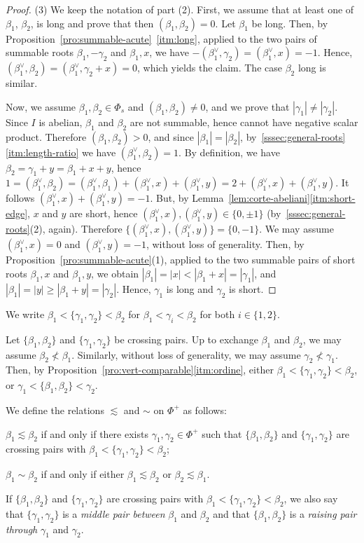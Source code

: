 \documentclass[ALCO,published]{cedram}
\theoremstyle{plain}
\newcommand\be{\beta}
\newcommand\ga{\gamma}
\begin{document}
\begin{proof}
(3)
We keep the notation of  part (2).
First, we assume that at least one of $\be_1$, $\be_2$, is long and prove that then $(\be_1, \be_2)=0$.
Let  $\be_1$ be long. 
Then, by Proposition~\ref{pro:summable-acute}~\ref{itm:long}, applied to the two pairs of summable roots $\be_1, -\ga_2$ and $\be_1, x$, we have $-(\be_1^\vee, \ga_2)=(\be_1^\vee, x)=-1$. 
Hence, $(\be_1^\vee, \be_2)=(\be_1^\vee, \ga_2+ x)=0$, which yields the claim.
The case $\be_2$ long is similar.
\par
Now, we assume $\be_1,\be_2\in \Phi_s$ and $(\be_1, \be_2)\neq 0$, and we prove that $|\ga_1|\neq |\ga_2|$.
Since $I$ is abelian, $\be_1$ and $\be_2$ are not summable, hence cannot have negative scalar product. 
Therefore $(\be_1, \be_2)> 0$, and since $|\be_1|=|\be_2|$,  by~\ref{sssec:general-roots}\ref{itm:length-ratio} we have $(\be_1^\vee, \be_2)=1$.  
By definition, we have $\be_2=\ga_1+y=\be_1+x+y$, hence 
$1=(\be_1^\vee, \be_2)=(\be_1^\vee, \be_1)+(\be_1^\vee, x)+(\be_1^\vee, y)=2+(\be_1^\vee, x)+(\be_1^\vee, y)$. 
It follows $(\be_1^\vee, x)+(\be_1^\vee, y)=-1$.
But, by Lemma~\ref{lem:corte-abeliani}\ref{itm:short-edge}, $x$ and $y$ are short, hence $(\be_1^\vee, x), (\be_1^\vee, y)\in \{0, \pm 1\}$  (by~\ref{sssec:general-roots}(2), again).
Therefore $\{(\be_1^\vee, x), (\be_1^\vee, y)\}=\{0, -1\}$.
We may assume $(\be_1^\vee, x)=0$ and $(\be_1^\vee, y)=-1$, without loss of generality.
Then, by Proposition~\ref{pro:summable-acute}(1), applied to the two summable pairs of short roots $\be_1, x$ and $\be_1, y$, we obtain $|\be_1|=|x|<|\be_1+x|=|\ga_1|$,  and $|\be_1|=|y|\geq |\be_1+y|=|\ga_2|$.  
Hence, $\ga_1$ is long and $\ga_2$ is short. 
\end{proof}

\begin{ntn}
We write $\be_1< \{\ga_1, \ga_2\}< \be_2$ for  $\be_1< \ga_i<\be_2$ for both $i\in \{1, 2\}$.
\end{ntn} 

Let $\{\be_1, \be_2\}$ and $\{\ga_1, \ga_2\}$ be crossing pairs. 
Up to exchange $\be_1$ and $\be_2$, we may assume $\be_2\not<\be_1$. 
Similarly, without loss of generality, we may assume $\ga_2\not< \ga_1$.
Then, by Proposition~\ref{pro:vert-comparable}\ref{itm:ordine}, either $\be_1< \{\ga_1, \ga_2\}< \be_2$, or $\ga_1< \{\be_1, \be_2\}< \ga_2$. 

\begin{defi}\label{def:lesssim}
We define the relations $\lesssim$ and $\sim$ on $\Phi^+$ as follows: 
\par
$\be_1\lesssim\be_2$
if and only if there exists $\ga_1, \ga_2\in \Phi^+$ such that 
 $\{\be_1, \be_2\}$ and $\{\ga_1, \ga_2\}$ are crossing pairs with $\be_1< \{\ga_1, \ga_2\}< \be_2$;
\par 
$\be_1\sim\be_2$
if and only if either $\be_1\lesssim \be_2$  or $\be_2\lesssim \be_1$.
\par
If  $\{\be_1, \be_2\}$ and $\{\ga_1, \ga_2\}$ are crossing pairs with $\be_1< \{\ga_1, \ga_2\}< \be_2$, we also say that $\{\ga_1, \ga_2\}$ is a {\it middle pair between} $\be_1$ and $\be_2$ and that $\{\be_1, \be_2\}$ is a {\it raising pair through} $\ga_1$ and $\ga_2$.
\end{defi}
\end{document}
